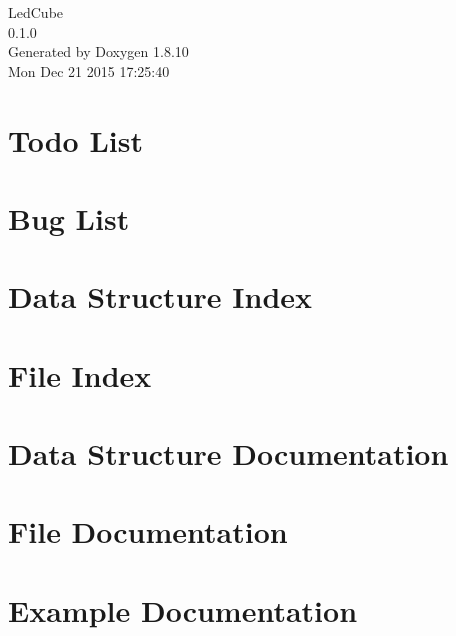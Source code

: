 \documentclass[twoside]{book}
\newcommand{\+}{\discretionary{\mbox{\scriptsize$\hookleftarrow$}}{}{}}
\newcommand{\clearemptydoublepage}{%
  \newpage{\pagestyle{empty}\cleardoublepage}%
}
\begin{document}
\hypersetup{pageanchor=false,
             bookmarks=true,
             bookmarksnumbered=true,
             pdfencoding=unicode
            }
\begin{titlepage}
\vspace*{7cm}
\begin{center}%
{\Large Led\+Cube \\[1ex]\large 0.\+1.\+0 }\\
\vspace*{1cm}
{\large Generated by Doxygen 1.8.10}\\
\vspace*{0.5cm}
{\small Mon Dec 21 2015 17:25:40}\\
\end{center}
\end{titlepage}
\clearemptydoublepage
\tableofcontents
\clearemptydoublepage
{}
\hypersetup{pageanchor=true}

\chapter{Todo List}
\label{todo}
\hypertarget{todo}{}

\chapter{Bug List}
\label{bug}
\hypertarget{bug}{}

\chapter{Data Structure Index}

\chapter{File Index}

\chapter{Data Structure Documentation}



\chapter{File Documentation}






































\chapter{Example Documentation}


\backmatter
\newpage
{}
\clearemptydoublepage
{}
\printindex
\end{document}
